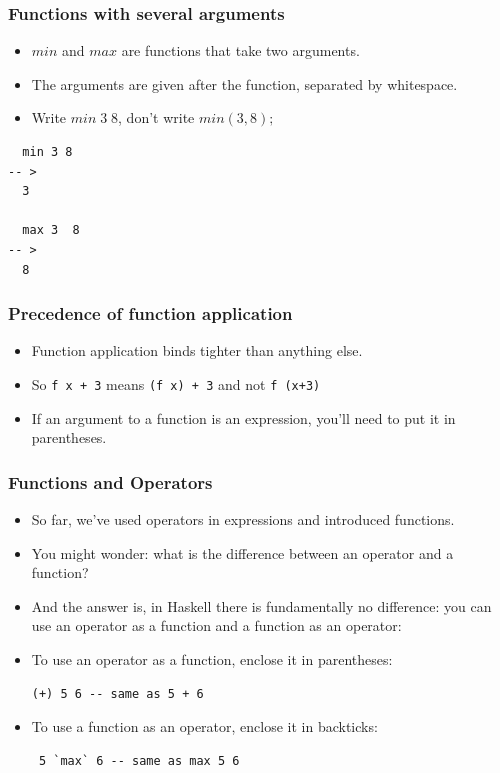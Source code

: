 \documentclass{beamer}
\begin{document}

\begin{frame}[fragile]
\frametitle{Functions with several arguments}

\begin{itemize}
\item $min$ and $max$ are functions that take two arguments.
\item The arguments are given after the function,  separated by
  whitespace. 
\item Write $min\; 3\; 8$, don't write $min(3,8);$
\end{itemize}

\begin{verbatim}
  min 3 8
-- >
  3

  max 3  8
-- >
  8
\end{verbatim}

\end{frame}

\begin{frame}
\frametitle{Precedence of function application}

\begin{itemize}
\item Function application binds tighter than anything else.
\item So \texttt{f x + 3} means \texttt{(f x) + 3} and not \texttt{f (x+3)}
\item If an argument to a function is an expression, you'll need to
  put it in parentheses.
\end{itemize}

\end{frame}

\begin{frame}[fragile]
\frametitle{Functions and Operators}

\begin{itemize}
\item So far, we've used operators in expressions and introduced functions.
\item You might wonder: what is the difference between an operator and a function?
\item And the answer is, in Haskell there is fundamentally no difference: you can use an operator as a function and a function as an operator: 
\item To use an operator as a function, enclose it in parentheses:

\begin{verbatim}
(+) 5 6 -- same as 5 + 6
\end{verbatim}
\item To use a function as an operator, enclose it in backticks:

\begin{verbatim}
 5 `max` 6 -- same as max 5 6
\end{verbatim}
\end{itemize}
\end{frame}
\end{document}
